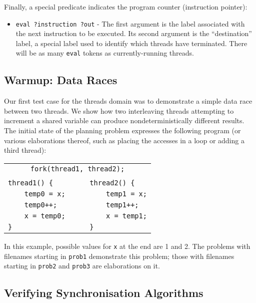 Finally, a special predicate indicates the program counter (instruction pointer):
\begin{itemize}
	\item \texttt{eval ?instruction ?out} - The first argument is the label associated with the next instruction to be executed. Its second argument is the ``destination'' label, a special label used to identify which threads have terminated. There will be as many \texttt{eval} tokens as currently-running threads.
\end{itemize}

\subsection{Warmup: Data Races}

Our first test case for the threads domain was to demonstrate a simple data race between two threads. We show how two interleaving threads attempting to increment a shared variable can produce nondeterministically different results. The initial state of the planning problem expresses the following program (or various elaborations thereof, such as placing the accesses in a loop or adding a third thread):

	\begin{center}
	\begin{tabular}{ll}
	\multicolumn{2}{c}{\texttt{fork(thread1, thread2);}} \\
	& \\
	\texttt{thread1() \{} & \texttt{thread2() \{} \\
	\texttt{~~~~temp0 = x;~~~~} & \texttt{~~~~temp1 = x;} \\
	\texttt{~~~~temp0++;} & \texttt{~~~~temp1++;} \\
	\texttt{~~~~x = temp0;} & \texttt{~~~~x = temp1;} \\
	\texttt{\}} & \texttt{\}} \\
	\end{tabular}
	\end{center}

In this example, possible values for \texttt{x} at the end are 1 and 2. The problems with filenames starting in \texttt{prob1} demonstrate this problem; those with filenames starting in \texttt{prob2} and \texttt{prob3} are elaborations on it.

\subsection{Verifying Synchronisation Algorithms}

